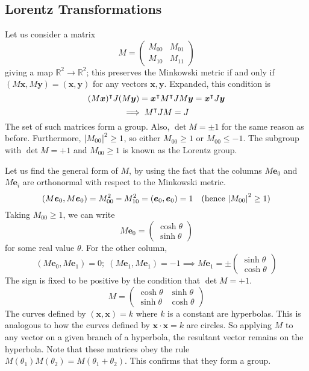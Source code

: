 \documentclass{article}
\begin{document}
\subsection{Lorentz Transformations}
Let us consider a matrix
\[ M = \begin{pmatrix}
		M_{00} & M_{01} \\
		M_{10} & M_{11}
	\end{pmatrix} \]
giving a map $\mathbb R^2 \to \mathbb R^2$; this preserves the Minkowski metric if and only if $(M\bm x, M\bm y) = (\bm x, \bm y)$ for any vectors $\bm x, \bm y$. Expanded, this condition is
\[ (M\bm x)^\intercal J(M \bm y) = \bm x^\intercal M^\intercal J M \bm y = \bm x^\intercal J \bm y \]
\[ \implies M^\intercal J M = J \]
The set of such matrices form a group. Also, $\det M = \pm 1$ for the same reason as before. Furthermore, $\abs{M_{00}}^2 \geq 1$, so either $M_{00} \geq 1$ or $M_{00} \leq -1$. The subgroup with $\det M = +1$ and $M_{00} \geq 1$ is known as the Lorentz group.

Let us find the general form of $M$, by using the fact that the columns $M \bm e_0$ and $M \bm e_i$ are orthonormal with respect to the Minkowski metric.
\[ (M \bm e_0, M \bm e_0) = M_{00}^2 - M_{10}^2 = (\bm e_0, \bm e_0) = 1\quad (\text{hence } \abs{M_{00}}^2 \geq 1) \]
Taking $M_{00} \geq 1$, we can write
\[ M\bm e_0 = \begin{pmatrix}
		\cosh \theta \\ \sinh \theta
	\end{pmatrix} \]
for some real value $\theta$. For the other column,
\[ (M \bm e_0, M \bm e_1) = 0;\; (M \bm e_1, M \bm e_1) = -1 \implies M \bm e_1 = \pm\begin{pmatrix}
		\sinh \theta \\
		\cosh \theta
	\end{pmatrix} \]
The sign is fixed to be positive by the condition that $\det M = +1$.
\[ M = \begin{pmatrix}
		\cosh \theta & \sinh \theta \\
		\sinh \theta & \cosh \theta
	\end{pmatrix} \]
The curves defined by $(\bm x, \bm x) = k$ where $k$ is a constant are hyperbolas. This is analogous to how the curves defined by $\bm x \cdot \bm x = k$ are circles. So applying $M$ to any vector on a given branch of a hyperbola, the resultant vector remains on the hyperbola.
Note that these matrices obey the rule $M(\theta_1) M(\theta_2) = M(\theta_1 + \theta_2)$. This confirms that they form a group.
\end{document}
